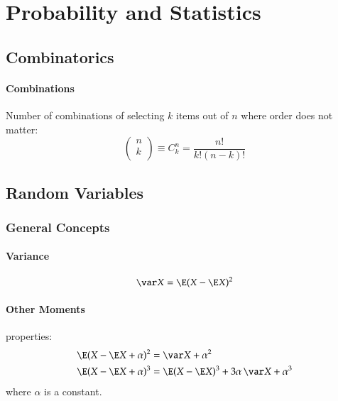 \documentclass[a4paper]{article}
\numberwithin{equation}{subsection}
\begin{document}
\newpage
\section{Probability and Statistics}
\label{sec:probatility_and_statistics}

\subsection{Combinatorics}
\label{sec:combinatorics}

\paragraph{Combinations}

Number of combinations of selecting $k$ items out of $n$ where order
does not matter:
\begin{equation}
  \begin{pmatrix}
    n \\ k \\
  \end{pmatrix}
  \equiv
  C_{k}^{n}
  =
  \frac{n!}{k! (n-k)!}
\end{equation}



\subsection{Random Variables}
\label{sec:random_variables}

\subsubsection{General Concepts}
\label{sec:RV_general_concepts}

\paragraph{Variance}

\begin{equation}
  \var X = \E (X - \E X)^{2}
\end{equation}

\paragraph{Other Moments}

properties:
\begin{align}
  \E (X - \E X + \alpha)^{2} &= \var X + \alpha^{2}
  \\
  \E (X - \E X + \alpha)^{3} &= \E(X - \E X)^{3} + 3\alpha\,\var X + \alpha^{3}
\end{align}
where $\alpha$ is a constant.
\end{document}
